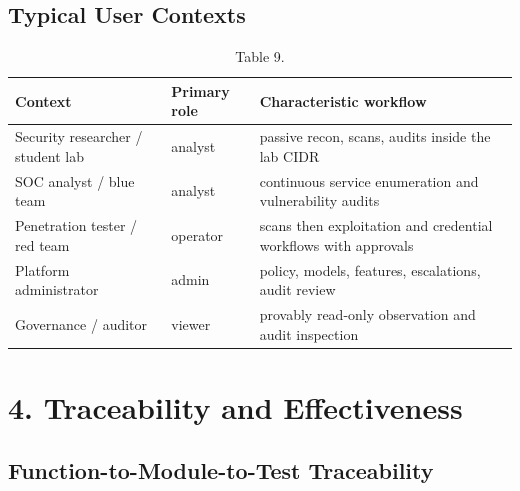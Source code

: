 \documentclass[10pt,journal,onecolumn]{IEEEtran}
\begin{document}
\subsection{Typical User Contexts}

\begin{table}[h]
\caption{Table 9.}
\label{tab:t9}
\begin{tabularx}{\columnwidth}{l >{\raggedright\arraybackslash}X >{\raggedright\arraybackslash}X}
\toprule
\textbf{Context} & \textbf{Primary role} & \textbf{Characteristic workflow}\\
\midrule
Security researcher / student lab & analyst & passive recon, scans, audits inside the lab CIDR\\
SOC analyst / blue team & analyst & continuous service enumeration and vulnerability audits\\
Penetration tester / red team & operator & scans then exploitation and credential workflows with approvals\\
Platform administrator & admin & policy, models, features, escalations, audit review\\
Governance / auditor & viewer & provably read-only observation and audit inspection\\
\bottomrule
\end{tabularx}
\end{table}

\section{4. Traceability and Effectiveness}

\subsection{Function-to-Module-to-Test Traceability}
\end{document}
